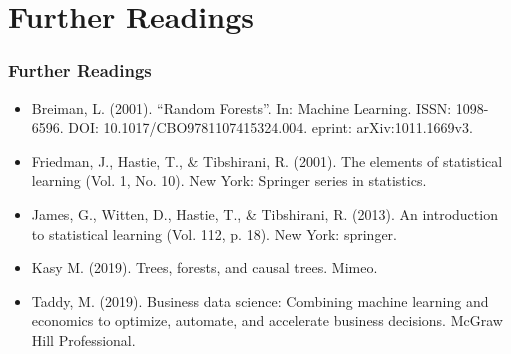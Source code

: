 \documentclass[
  shownotes,
  xcolor={svgnames},
  hyperref={colorlinks,citecolor=DarkBlue,linkcolor=DarkRed,urlcolor=DarkBlue}
  , aspectratio=169]{beamer}
\begin{document}
\section{Further Readings}
\begin{frame}
\frametitle{Further Readings}

\begin{itemize}


  \item Breiman, L. (2001). “Random Forests”. In: Machine Learning. ISSN: 1098-6596. DOI: 10.1017/CBO9781107415324.004. eprint: arXiv:1011.1669v3.
  \item Friedman, J., Hastie, T., \& Tibshirani, R. (2001). The elements of statistical learning (Vol. 1, No. 10). New York: Springer series in statistics.
  \medskip
  \item James, G., Witten, D., Hastie, T., \& Tibshirani, R. (2013). An introduction to statistical learning (Vol. 112, p. 18). New York: springer.
  \medskip 
  \item Kasy M. (2019). Trees, forests, and causal trees. Mimeo.
  \medskip
  \item Taddy, M. (2019). Business data science: Combining machine learning and economics to optimize, automate, and accelerate business decisions. McGraw Hill Professional.
  
  
\end{itemize}

\end{frame}






\end{document}
